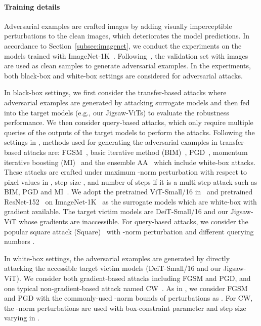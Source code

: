 \documentclass{article}
\begin{document}
\paragraph{Training details}
Adversarial examples are crafted images by adding visually imperceptible perturbations to the clean images, which deteriorates the model predictions. 
In accordance to Section~\ref{subsec:imagenet}, we conduct the experiments on the models trained with ImageNet{-1K}~\cite{deng2009imagenet}.
Following~\cite{xie2019improving}, the validation set with  images are used as clean samples to generate adversarial examples. 
In the experiments, both black-box and white-box settings are considered for adversarial attacks. 

In black-box settings, we first consider the transfer-based attacks where adversarial examples are generated by attacking  surrogate  models and then fed into the target models (e.g., our Jigsaw-ViTs) to evaluate the robustness performance. 
We then consider query-based attacks, which only require multiple queries of the outputs of the target models to perform the attacks. 
Following the settings in \cite{xie2019improving,wu2020skip}, methods used for generating the adversarial examples in transfer-based attacks are: FGSM~\cite{goodfellow2014explaining}, 
basic iterative method (BIM)~\cite{kurakin2018adversarial}, 
PGD~\cite{madry2018towards},
momentum iterative boosting (MI)~\cite{dong2018boosting} and the ensemble AA~\cite{croce2020reliable} which include white-box attacks.
These attacks are crafted under maximum -norm perturbation  with respect to pixel values in , step size , and number of steps  if it is a multi-step attack such as BIM, PGD and MI~\cite{wu2020skip}.
We adopt the pretrained ViT-Small/16 in~\cite{dosovitskiy2021an} and pretrained ResNet-152~\cite{he2016deep} on ImageNet{-1K}~\cite{deng2009imagenet} as the surrogate models which are white-box with gradient available.
The target victim models are DeiT-Small/16 and our Jigsaw-ViT whose gradients are inaccessible.
For query-based attacks, we consider the popular square attack (Square)~\cite{andriushchenko2020square} with -norm perturbation  and  different querying numbers  .

In white-box settings, the adversarial examples are generated by directly attacking the accessible target victim models (DeiT-Small/16 and our Jigsaw-ViT).
We consider both gradient-based attacks including FGSM and PGD, and one typical non-gradient-based attack named CW~\cite{carlini2017towards}.
As in \cite{wu2020skip}, we consider FGSM and PGD with the commonly-used -norm bounds of perturbations as .
For CW, the -norm perturbations are used with box-constraint parameter  and step size varying in .
\end{document}
